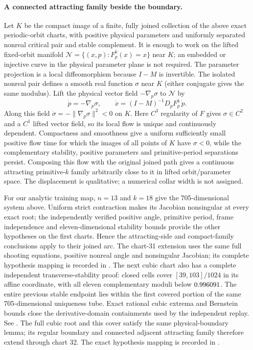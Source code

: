 \documentclass[11pt,letterpaper]{article}
\begin{document}
\paragraph{A connected attracting family beside the boundary.}
Let $K$ be the compact image of a finite, fully joined collection of the above
exact periodic-orbit charts, with positive physical parameters and uniformly
separated nonreal critical pair and stable complement. It is enough to work
on the lifted fixed-orbit manifold
$\mathcal N=\{(x,p):F_p^k(x)=x\}$ near $K$; an embedded or injective curve in
the physical parameter plane is not required. The parameter projection is a
local diffeomorphism because $I-M$ is invertible. The isolated nonreal pair
defines a smooth real function $\sigma$ near $K$ (either conjugate gives the
same modulus). Lift the physical vector field $-\nabla_p\sigma$ to
$\mathcal N$ by
\[
 \dot p=-\nabla_p\sigma,\qquad
 \dot x=(I-M)^{-1}D_pF_p^k\,\dot p.
\]
Along this field $\dot\sigma=-\|\nabla_p\sigma\|^2<0$ on $K$.
Here $C^3$ regularity of $F$ gives $\sigma\in C^2$ and a $C^1$ lifted
vector field, so its local flow is unique and continuously dependent.
Compactness and smoothness give a uniform sufficiently small positive flow
time for which the images of all points of $K$ have $\sigma<0$, while the
complementary stability, positive parameters and primitive-period
separations persist. Composing this flow with the original joined path gives
a continuous attracting primitive-$k$ family arbitrarily close to it in
lifted orbit/parameter space. The displacement is qualitative; a numerical collar width is not assigned.


For our analytic training map, $n=13$ and $k=18$ give the 705-dimensional
system above. Uniform strict contraction makes its Jacobian nonsingular at
every exact root; the independently verified positive angle, primitive period,
frame independence and eleven-dimensional stability bounds provide the other
hypotheses on the first \nPALStableCharts{} charts. Hence the attracting-side
and compact-family conclusions apply to their joined arc. The chart-31 extension
uses the same full shooting equations, positive nonreal angle and nonsingular
Jacobian; its complete hypothesis mapping is recorded in
.
The next cubic chart also has a complete independent transverse-stability proof:
\nChartThirtyTwoCells{} closed cells cover $[39,103]/1024$ in its affine coordinate,
with all eleven complementary moduli below $0.996091$.
The entire previous stable endpoint lies within the first covered portion of
the same 705-dimensional uniqueness tube. Exact rational cubic extrema and
Bernstein bounds close the derivative-domain containments used by the independent replay.
See .
The full cubic root and this cover satisfy the same physical-boundary lemma;
its regular boundary and connected adjacent attracting family therefore extend
through chart 32. The exact hypothesis mapping is recorded in
.
\end{document}
